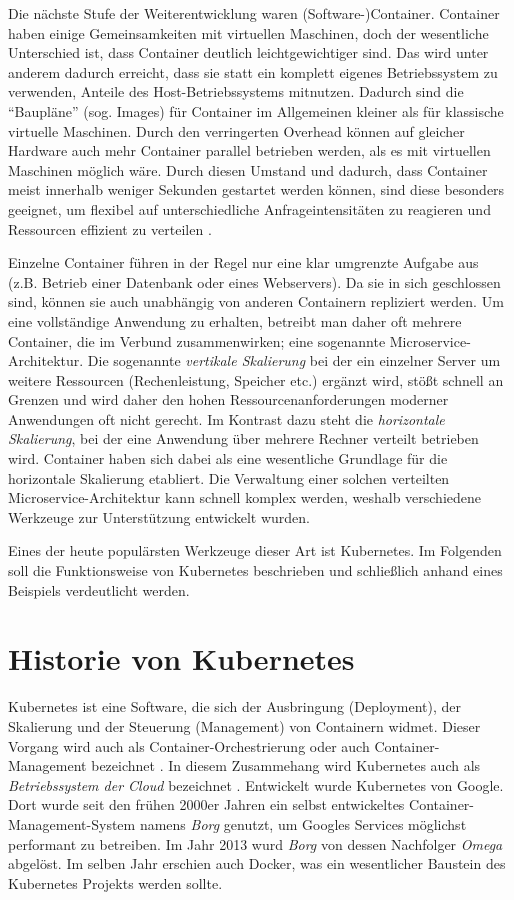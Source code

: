 \documentclass[11pt,a4paper]{article}
\begin{document}
Die nächste Stufe der Weiterentwicklung waren (Software-)Container. Container haben einige Gemeinsamkeiten mit virtuellen Maschinen, doch der wesentliche Unterschied ist,
dass Container deutlich leichtgewichtiger sind. Das wird unter anderem dadurch erreicht, dass sie statt ein komplett eigenes Betriebssystem zu verwenden, 
Anteile des Host-Betriebssystems mitnutzen. Dadurch sind die ``Baupläne'' (sog. Images) für Container im Allgemeinen kleiner als für klassische virtuelle Maschinen.
Durch den verringerten Overhead können auf gleicher Hardware auch mehr Container parallel betrieben werden, als es mit virtuellen Maschinen möglich wäre.
Durch diesen Umstand und dadurch, dass Container meist innerhalb weniger Sekunden gestartet werden können, sind diese besonders geeignet,
um flexibel auf unterschiedliche Anfrageintensitäten zu reagieren und Ressourcen effizient zu verteilen \cite{kofler2021docker}.

Einzelne Container führen in der Regel nur eine klar umgrenzte Aufgabe aus (z.B. Betrieb einer Datenbank oder eines Webservers). Da sie in sich geschlossen sind,
können sie auch unabhängig von anderen Containern repliziert werden. Um eine vollständige Anwendung zu erhalten, betreibt man daher oft mehrere Container,
die im Verbund zusammenwirken; eine sogenannte Microservice-Architektur. 
Die sogenannte \emph{vertikale Skalierung} bei der ein einzelner Server um weitere Ressourcen (Rechenleistung, Speicher etc.)
ergänzt wird, stößt schnell an Grenzen und wird daher den hohen Ressourcenanforderungen moderner Anwendungen oft nicht gerecht.
Im Kontrast dazu steht die \emph{horizontale Skalierung}, bei der eine Anwendung über mehrere Rechner verteilt betrieben wird.
Container haben sich dabei als eine wesentliche Grundlage für die horizontale Skalierung etabliert.
Die Verwaltung einer solchen verteilten Microservice-Architektur kann schnell komplex werden, weshalb verschiedene Werkzeuge zur Unterstützung entwickelt wurden.

Eines der heute populärsten Werkzeuge dieser Art ist Kubernetes. Im Folgenden soll die Funktionsweise von Kubernetes beschrieben und schließlich anhand eines Beispiels 
verdeutlicht werden.

\section{Historie von Kubernetes}
Kubernetes ist eine Software, die sich der Ausbringung (Deployment), der Skalierung und der Steuerung (Management) von Containern widmet.
Dieser Vorgang wird auch als Container-Orchestrierung oder auch Container-Management bezeichnet \cite{Bisong2019}.
In diesem Zusammehang wird Kubernetes auch als \emph{Betriebssystem der Cloud} bezeichnet \cite{Schmeling_Dargatz_2022}. 
Entwickelt wurde Kubernetes von Google. Dort wurde seit den frühen 2000er Jahren ein selbst entwickeltes Container-Management-System namens \emph{Borg} genutzt,
um Googles Services möglichst performant zu betreiben. 
Im Jahr 2013 wurd \emph{Borg} von dessen Nachfolger \emph{Omega} abgelöst. Im selben Jahr erschien auch Docker, was ein wesentlicher Baustein des Kubernetes 
Projekts werden sollte.
\end{document}
